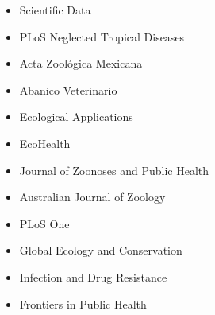 \documentclass[11pt, letter]{article}
\begin{document}
\begin{itemize}
 \item Scientific Data
 \item PLoS Neglected Tropical Diseases
 \item Acta Zool\'ogica Mexicana
 \item Abanico Veterinario
 \item Ecological Applications
 \item EcoHealth
 \item Journal of Zoonoses and Public Health
 \item Australian Journal of Zoology
 \item PLoS One
 \item Global Ecology and Conservation
 \item Infection and Drug Resistance
 \item Frontiers in Public Health
\end{itemize}
\end{document}
